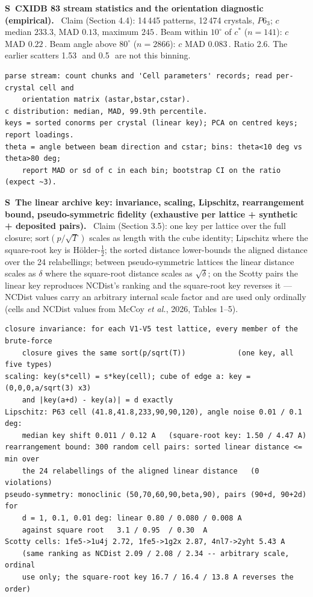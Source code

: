 \documentclass[11pt]{article}
\newcommand{\Ang}{\text{\AA}}
\newcounter{scheck}
\renewcommand{\thescheck}{S\arabic{scheck}}
\newcommand{\sitem}[2]{\medskip\noindent\refstepcounter{scheck}\label{#1}\textbf{\thescheck\ #2.}\ }
\begin{document}
\sitem{z:xfel}{CXIDB 83 stream statistics and the orientation diagnostic (empirical)}
Claim (Section 4.4): 14\,445 patterns, 12\,474 crystals, $P6_3$; $c$ median $233.3$, MAD $0.13$, maximum $245$\,\Ang. Beam within $10^\circ$ of $c^*$ ($n=141$): $c$ MAD $0.22$\,\Ang. Beam angle above $80^\circ$ ($n=2866$): $c$ MAD $0.083$\,\Ang. Ratio 2.6. The earlier scatters 1.53\,\Ang\ and 0.5\,\Ang\ are not this binning.
\begin{footnotesize}\begin{verbatim}
parse stream: count chunks and 'Cell parameters' records; read per-crystal cell and
    orientation matrix (astar,bstar,cstar).
c distribution: median, MAD, 99.9th percentile.
keys = sorted conorms per crystal (linear key); PCA on centred keys; report loadings.
theta = angle between beam direction and cstar; bins: theta<10 deg vs theta>80 deg;
    report MAD or sd of c in each bin; bootstrap CI on the ratio (expect ~3).
\end{verbatim}\end{footnotesize}

\sitem{z:linear-key}{The linear archive key: invariance, scaling, Lipschitz, rearrangement bound, pseudo-symmetric fidelity (exhaustive per lattice + synthetic + deposited pairs)}
Claim (Section 3.5): one key per lattice over the full closure; $\mathrm{sort}(p/\sqrt{T})$ scales as length with the cube identity; Lipschitz where the square-root key is H\"older-$\tfrac12$; the sorted distance lower-bounds the aligned distance over the 24 relabellings; between pseudo-symmetric lattices the linear distance scales as $\delta$ where the square-root distance scales as $\sqrt\delta$; on the Scotty pairs the linear key reproduces NCDist's ranking and the square-root key reverses it --- NCDist values carry an arbitrary internal scale factor and are used only ordinally (cells and NCDist values from McCoy \emph{et al.}, 2026, Tables 1--5).
\begin{footnotesize}\begin{verbatim}
closure invariance: for each V1-V5 test lattice, every member of the brute-force
    closure gives the same sort(p/sqrt(T))            (one key, all five types)
scaling: key(s*cell) = s*key(cell); cube of edge a: key = (0,0,0,a/sqrt(3) x3)
    and |key(a+d) - key(a)| = d exactly
Lipschitz: P63 cell (41.8,41.8,233,90,90,120), angle noise 0.01 / 0.1 deg:
    median key shift 0.011 / 0.12 A   (square-root key: 1.50 / 4.47 A)
rearrangement bound: 300 random cell pairs: sorted linear distance <= min over
    the 24 relabellings of the aligned linear distance   (0 violations)
pseudo-symmetry: monoclinic (50,70,60,90,beta,90), pairs (90+d, 90+2d) for
    d = 1, 0.1, 0.01 deg: linear 0.80 / 0.080 / 0.008 A
    against square root   3.1 / 0.95  / 0.30  A
Scotty cells: 1fe5->1u4j 2.72, 1fe5->1g2x 2.87, 4nl7->2yht 5.43 A
    (same ranking as NCDist 2.09 / 2.08 / 2.34 -- arbitrary scale, ordinal
    use only; the square-root key 16.7 / 16.4 / 13.8 A reverses the order)
\end{verbatim}\end{footnotesize}
\end{document}
